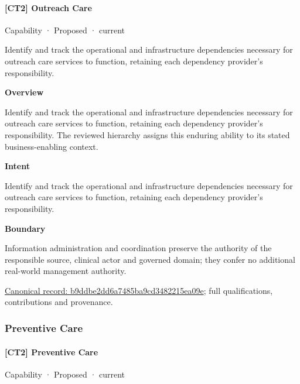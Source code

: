 \paragraph{[CT2] Outreach Care}

\label{element:b9ddbe2dd6a7485ba9cd3482215ea09e}
{\small Capability · Proposed · current}\par

Identify and track the operational and infrastructure dependencies necessary for outreach care services to function, retaining each dependency provider's responsibility.



\textbf{Overview}



Identify and track the operational and infrastructure dependencies necessary for outreach care services to function, retaining each dependency provider's responsibility. The reviewed hierarchy assigns this enduring ability to its stated business-enabling context.



\textbf{Intent}



Identify and track the operational and infrastructure dependencies necessary for outreach care services to function, retaining each dependency provider's responsibility.



\textbf{Boundary}



Information administration and coordination preserve the authority of the responsible source, clinical actor and governed domain; they confer no additional real-world management authority.


{\footnotesize \href{../../../../continuum/strategy/capability/b9ddbe2dd6a7485ba9cd3482215ea09e.md}{Canonical record: b9ddbe2dd6a7485ba9cd3482215ea09e}; full qualifications, contributions and provenance.}\par
\subsubsection{Preventive Care}

\paragraph{[CT2] Preventive Care}

\label{element:dfdc4f0273ba4910848b3b65c9ef6ab2}
{\small Capability · Proposed · current}\par

